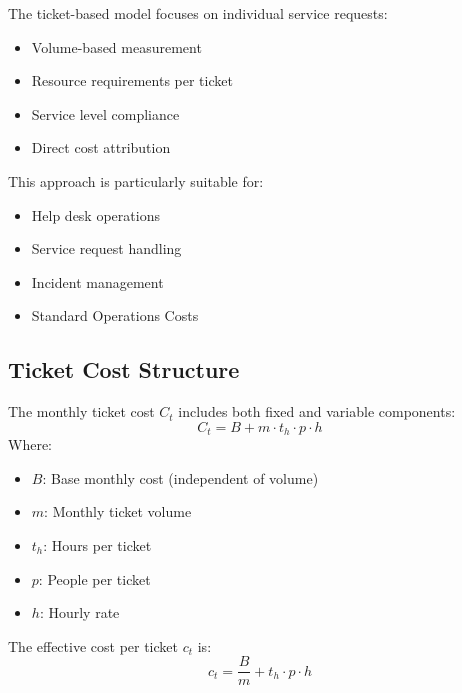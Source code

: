 \documentclass[12pt,a4paper]{article}
\newenvironment{definition}[1]
{\begin{mdframed}[style=definitionstyle,frametitle={Definition: #1}]}
{\end{mdframed}}
\newenvironment{explanation}
{\begin{mdframed}[style=explanationstyle,frametitle={Explanation}]}
{\end{mdframed}}
\begin{document}
\begin{explanation}
The ticket-based model focuses on individual service requests:
\begin{itemize}
    \item Volume-based measurement
    \item Resource requirements per ticket
    \item Service level compliance
    \item Direct cost attribution
\end{itemize}

This approach is particularly suitable for:
\begin{itemize}
    \item Help desk operations
    \item Service request handling
    \item Incident management
    \item Standard Operations Costs
\end{itemize}
\end{explanation}

\subsection{Ticket Cost Structure}

\begin{definition}{Base Ticket Cost}
The monthly ticket cost $C_t$ includes both fixed and variable components:
\begin{equation}
    C_t = B + m \cdot t_h \cdot p \cdot h
\end{equation}
Where:
\begin{itemize}
    \item $B$: Base monthly cost (independent of volume)
    \item $m$: Monthly ticket volume
    \item $t_h$: Hours per ticket
    \item $p$: People per ticket
    \item $h$: Hourly rate
\end{itemize}

The effective cost per ticket $c_t$ is:
\begin{equation}
    c_t = \frac{B}{m} + t_h \cdot p \cdot h
\end{equation}
\end{definition}
\end{document}
